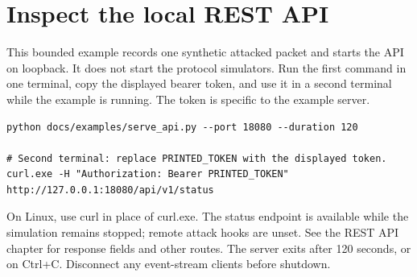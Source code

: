 

\section*{Inspect the local REST API}
This bounded example records one synthetic attacked packet and starts the API on loopback. It does not start the protocol simulators. Run the first command in one terminal, copy the displayed bearer token, and use it in a second terminal while the example is running. The token is specific to the example server.

\begin{lstlisting}[title={Commands / Windows PowerShell}]
python docs/examples/serve_api.py --port 18080 --duration 120

# Second terminal: replace PRINTED_TOKEN with the displayed token.
curl.exe -H "Authorization: Bearer PRINTED_TOKEN" http://127.0.0.1:18080/api/v1/status
\end{lstlisting}
On Linux, use curl in place of curl.exe. The status endpoint is available while the simulation remains stopped; remote attack hooks are unset. See the REST API chapter for response fields and other routes. The server exits after 120 seconds, or on Ctrl+C. Disconnect any event-stream clients before shutdown.


